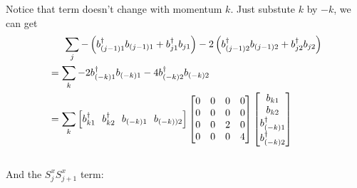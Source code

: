 \documentclass[letter]{article}
\begin{document}
Notice that term doesn't change with momentum $k$. Just substute $k$ by $-k$, we can get $$\begin{aligned}
    & \indent \sum_j -\left(b_{(j-1)1}^{\dagger}b_{(j-1)1}+b_{j1}^{\dagger}b_{j1}\right)-2\left(b_{(j-1)2}^{\dagger}b_{(j-1)2}+b_{j2}^{\dagger}b_{j2}\right)\\
    &= \sum_{k}-2b_{(-k)1}^{\dagger}b_{(-k)1}-4b_{(-k)2}^{\dagger}b_{(-k)2}\\
    &=\sum_k \left[
        b_{k1}^{\dagger} \ \ 
        b_{k2}^{\dagger}\  \ 
        b_{(-k)1}\ \ 
        b_{(-k))2}\right]
       \begin{bmatrix}
            0 & 0 & 0 & 0 \\
           0 &  0 & 0 &0 \\
           0 &  0 & 2 &0\\
            0 & 0 & 0& 4
            \end{bmatrix}\begin{bmatrix}
                b_{k1}  \\
                b_{k2}  \\
                b_{(-k)1}^{\dagger}\\
                b_{(-k)2}^{\dagger}
                \end{bmatrix}
    \end{aligned}
    $$\\
And the $S_j^x S_{j+1}^x$ term:
\end{document}
